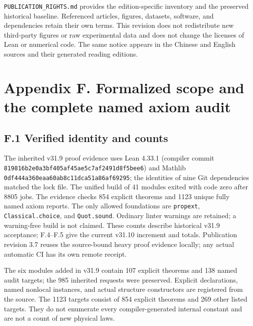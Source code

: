\documentclass[
  11pt,
  oneside]{book}
\begin{document}
\texttt{PUBLICATION\_\allowbreak RIGHTS.\allowbreak md} provides the edition-specific inventory
and the preserved historical baseline. Referenced articles, figures,
datasets, software, and dependencies retain their own terms. This
revision does not redistribute new third-party figures or raw
experimental data and does not change the licenses of Lean or numerical
code. The same notice appears in the Chinese and English sources and
their generated reading editions.

\chapter{Appendix F. Formalized scope and the complete named axiom
audit}\label{appendix-f}

\section{F.1 Verified identity and counts}

The inherited v31.9 proof evidence uses Lean 4.33.1 (compiler commit
\texttt{819816b2e0a3\allowbreak bf405af45ae5\allowbreak c7af2491d8f5\allowbreak bee6}) and Mathlib
\texttt{0df444a360ea\allowbreak a60ab8c11dca\allowbreak 51a86af69295}; the identities of
nine Git dependencies matched the lock file. The unified build of 41
modules exited with code zero after 8805 jobs. The evidence checks 854
explicit theorems and 1123 unique fully named axiom reports. The only
allowed foundations are \texttt{propext}, \texttt{Classical.\allowbreak choice}, and
\texttt{Quot.\allowbreak sound}. Ordinary linter warnings are retained; a
warning-free build is not claimed. These counts describe historical
v31.9 acceptance; F.4--F.5 give the current v31.10 increment and totals.
Publication revision 3.7 reuses the source-bound heavy proof evidence
locally; any actual automatic CI has its own remote receipt.

The six modules added in v31.9 contain 107 explicit theorems and 138
named audit targets; the 985 inherited requests were preserved. Explicit
declarations, named nonlocal instances, and actual structure
constructors are registered from the source. The 1123 targets consist of
854 explicit theorems and 269 other listed targets. They do not
enumerate every compiler-generated internal constant and are not a count
of new physical laws.
\end{document}
